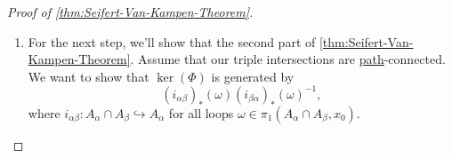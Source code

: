 \begin{proof}[Proof of \autoref{thm:Seifert-Van-Kampen-Theorem}]
\begin{enumerate}
		      Specifically, since
		      \begin{itemize}
			      \item \(A_{\alpha }\) is open for all \(\alpha \)
			      \item \(I\) is compact,
		      \end{itemize}
		      then for all \(i\), we choose a \hyperref[def:path]{path} \(h_{i}\) from \(x_0\) to \(\gamma (s_{i})\) in \(A_{\sigma _{i-1}}\cap A_{\alpha _{i}}\), using
		      \hyperref[def:path]{path}-connectedness of the pairwise intersections. Now, take \(\gamma \) and write it as
		      \[
			      \gamma = (\gamma _1\cdot \overline{h} _1)\cdot (\overline{h} _1\cdot \gamma _2)\cdot \dots \cdot (\gamma_{n-1}\cdot \overline{h} _{n-1}) \cdot (h_{n-1}\cdot \gamma _n).
		      \]
		      Observe that each of these \hyperref[def:path]{paths} is fully contained in \(A_{\alpha _{i}}\), so this implies that \(\gamma \in \im  (\Phi )\), therefore
		      \(\Phi \) is surjective.
		\item For the next step, we'll show that the second part of \autoref{thm:Seifert-Van-Kampen-Theorem}. Assume that our triple intersections are \hyperref[def:path]{path}-connected.
		      We want to show that \(\ker (\Phi ) \) is generated by
		      \[
			      (i_{\alpha \beta })_\ast (\omega )(i_{\beta \alpha })_\ast (\omega )^{-1},
		      \]
		      where \(i_{\alpha \beta }\colon A_\alpha \cap A_\beta \hookrightarrow A_\alpha\) for all loops \(\omega \in\pi_1(A_\alpha \cap A_\beta , x_0)\).


\end{enumerate}
\end{proof}

